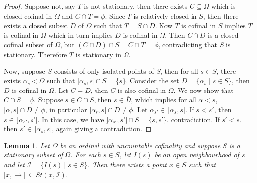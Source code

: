 \documentclass[12pt,oneside,english]{amsbook}
\numberwithin{equation}{section} %
\numberwithin{figure}{section} %
\theoremstyle{plain}
\numberwithin{section}{chapter}
\theoremstyle{plain}
\newtheorem{lem}[thm]{Lemma}
\begin{document}
\begin{proof}
  Suppose not, say $T$ is not stationary, then there exists $C \subseteq \Omega$ which is closed cofinal in $\Omega$ and $C \cap T = \phi$. Since $T$ is relatively closed in $S$, then there exists a closed subset $D$ of $\Omega$ such that $T = S \cap D$. Now $T$ is cofinal in $S$ implies $T$ is cofinal in $\Omega$ which in turn implies $D$ is cofinal in $\Omega$. Then $C \cap D$ is a closed cofinal subset of $\Omega$, but $(C \cap D) \cap S = C \cap T = \phi$, contradicting that $S$ is stationary. Therefore $T$ is stationary in $\Omega$.

  Now, suppose $S$ consists of only isolated points of $S$, then for all $s \in S$, there exists $\alpha_s < \Omega$ such that $]\alpha_s,s] \cap S = \{s\}$. Consider the set $D = \{\alpha_s \; | \; s \in S\}$, then $D$ is cofinal in $\Omega$. Let $C = \overline{D}$, then $C$ is also cofinal in $\Omega$. We now show that $C \cap S = \phi$. Suppose $s \in C \cap S$, then $s \in \overline{D}$, which implies for all $\alpha < s$, $]\alpha,s] \cap D \neq \phi$, in particular $]\alpha_s,s] \cap D \neq \phi$. Let $\alpha_{s'} \in \, ]\alpha_s,s]$. If $s < s'$, then $s \in \, ]\alpha_{s'},s']$. In this case, we have $]\alpha_{s'},s'] \cap S = \{s,s'\}$, contradiction. If $s' < s$, then $s' \in \, ]\alpha_s,s]$, again giving a contradiction.   
\end{proof}

\begin{lem} \label{lem:paracompact:stationary:2}
  Let $\Omega$ be an ordinal with uncountable cofinality and suppose $S$ is a stationary subset of $\Omega$. For each $s \in S$, let $I(s)$ be an open neighbourhood of $s$ and let $\mathcal{I} = \{I(s) \; | \; s \in S \}$. Then there exists a point $x \in S$ such that $[x, \rightarrow[ \, \subseteq St(x,\mathcal{I})$.
\end{lem}
\end{document}
